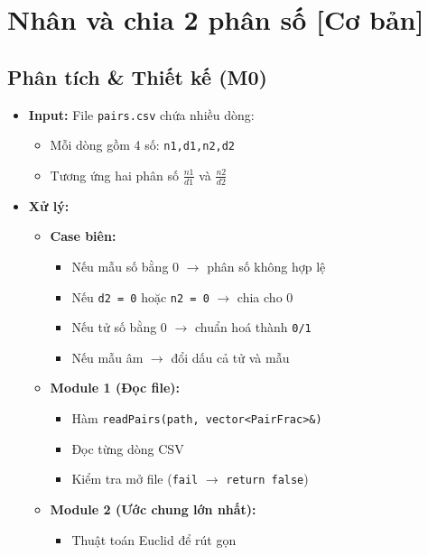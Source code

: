 \section{Nhân và chia 2 phân số [Cơ bản]}
\subsection{Phân tích \& Thiết kế (M0)}
\begin{itemize}
    \item \textbf{Input:}
    File \texttt{pairs.csv} chứa nhiều dòng:
    \begin{itemize}
        \item Mỗi dòng gồm 4 số: \texttt{n1,d1,n2,d2}
        \item Tương ứng hai phân số $\frac{n1}{d1}$ và $\frac{n2}{d2}$
    \end{itemize}

    \item \textbf{Xử lý:}
    \begin{itemize}
        \item \textbf{Case biên:}
        \begin{itemize}
            \item Nếu mẫu số bằng 0 $\rightarrow$ phân số không hợp lệ
            \item Nếu \texttt{d2 = 0} hoặc \texttt{n2 = 0} $\rightarrow$ chia cho 0
            \item Nếu tử số bằng 0 $\rightarrow$ chuẩn hoá thành \texttt{0/1}
            \item Nếu mẫu âm $\rightarrow$ đổi dấu cả tử và mẫu
        \end{itemize}

        \item \textbf{Module 1 (Đọc file):}
        \begin{itemize}
            \item Hàm \texttt{readPairs(path, vector<PairFrac>\&)}
            \item Đọc từng dòng CSV
            \item Kiểm tra mở file (\texttt{fail} $\rightarrow$ \texttt{return false})
        \end{itemize}

        \item \textbf{Module 2 (Ước chung lớn nhất):}
        \begin{itemize}
            \item Thuật toán Euclid để rút gọn
        \end{itemize}


\end{itemize}
\end{itemize}
